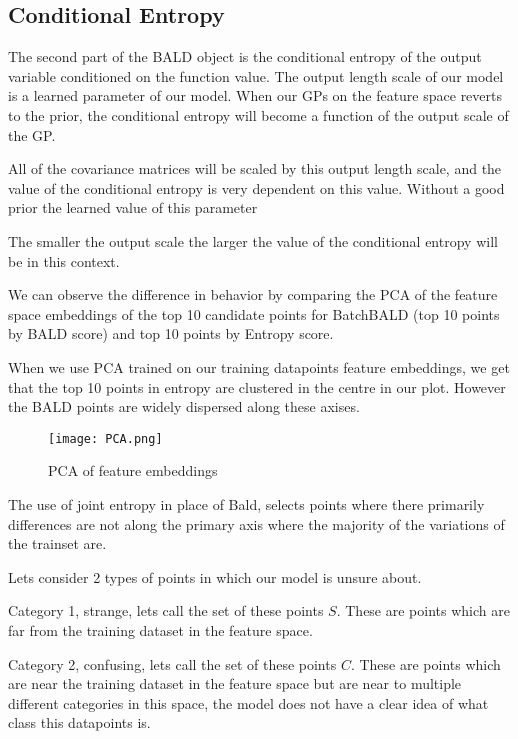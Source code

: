 \documentclass[12pt, a4paper]{report}
\theoremstyle{definition}
\theoremstyle{definition}
\theoremstyle{definition}
\begin{document}
\subsection{Conditional Entropy}

The second part of the BALD object is the conditional entropy of the output variable conditioned on the function value. The output length scale of our model is a learned parameter of our model. When our GPs on the feature space reverts to the prior, the conditional entropy will become a function of the output scale of the GP.

All of the covariance matrices will be scaled by this output length scale, and the value of the conditional entropy is very dependent on this value. Without a good prior the learned value of this parameter 

The smaller the output scale the larger the value of the conditional entropy will be in this context.

We can observe the difference in behavior by comparing the PCA of the feature space embeddings of the top 10 candidate points for BatchBALD (top 10 points by BALD score) and top 10 points by Entropy score.

When we use PCA trained on our training datapoints feature embeddings, we get that the top 10 points in entropy are clustered in the centre in our plot. However the BALD points are widely dispersed along these axises.


\begin{figure}[H]
    \centering
    \texttt{[image: PCA.png]}
    \caption{PCA of feature embeddings}
\end{figure}
        

The use of joint entropy in place of Bald, selects points where there primarily differences are not along the primary axis where the majority of the variations of the trainset are.



Lets consider 2 types of points in which our model is unsure about.

Category 1, strange, lets call the set of these points $S$. These are points which are far from the training dataset in the feature space.

Category 2, confusing, lets call the set of these points $C$. These are points which are near the training dataset in the feature space but are near to multiple different categories in this space, the model does not have a clear idea of what class this datapoints is.
\end{document}
